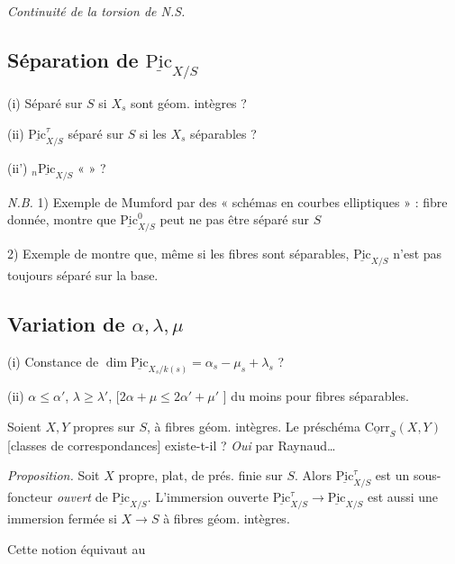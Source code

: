 \documentclass[11pt,a4paper]{article}
\begin{document}
\emph{Continuité de la torsion de N.S.}

\subsection{Séparation de $\underline{\mathrm{Pic}}_{X/S}$}

(i) Séparé sur $S$ si $X_s$ sont géom. intègres ?

(ii) $\underline{\mathrm{Pic}}^{\tau}_{X/S}$ séparé sur $S$ si les $X_s$ séparables ?

(ii') ${}_n\underline{\mathrm{Pic}}_{X/S}$ \quad « \quad » ?

\emph{N.B.} 1) Exemple de Mumford par des « schémas en courbes elliptiques » : fibre donnée, montre que $\underline{\mathrm{Pic}}^{0}_{X/S}$ peut ne pas être séparé sur $S$

2) Exemple de  montre que, même si les fibres sont séparables, $\underline{\mathrm{Pic}}_{X/S}$ n'est pas toujours séparé sur la base.

\subsection{Variation de $\alpha, \lambda, \mu$}

(i) Constance de $\dim \underline{\mathrm{Pic}}_{X_s/k(s)} = \alpha_s - \mu_s + \lambda_s$ ?

(ii) $\alpha \leq \alpha'$, $\lambda \geq \lambda'$, [$2\alpha + \mu \leq 2\alpha' + \mu'$ ] du moins pour fibres séparables.

Soient $X, Y$ propres sur $S$, à fibres géom. intègres. Le préschéma $\underline{\mathrm{Corr}}_S(X, Y)$ [classes de correspondances] existe-t-il ? \emph{Oui} par Raynaud…

\emph{Proposition.} Soit $X$ propre, plat, de prés. finie sur $S$. Alors $\underline{\mathrm{Pic}}^{\tau}_{X/S}$ est un sous-foncteur \emph{ouvert}  de $\underline{\mathrm{Pic}}_{X/S}$. L'immersion ouverte $\underline{\mathrm{Pic}}^{\tau}_{X/S} \to \underline{\mathrm{Pic}}_{X/S}$ est aussi une immersion fermée si $X \to S$  à fibres géom. intègres.

Cette notion équivaut au \ill{}
\end{document}
